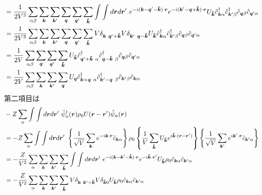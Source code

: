 \documentclass[dvipdfmx, 11pt, a4paper]{jsarticle}
\theoremstyle{definition}
\numberwithin{equation}{section}
\begin{document}
\begin{derivationBox}
\begin{align}
            &= \frac{1}{2V^3}\sum_{\alpha \beta} \sum_{\bm{k}} \sum_{\bm{k}'} \sum_{\bm{q}} \sum_{\bm{q}'}\sum_{\bm{\tilde{k}}}\int \int d\bm{r} d\bm{r}'\  e^{-i(\bm{k}-\bm{q}'-\bm{\tilde{k}})\cdot \bm{r}}  e^{-i(\bm{k}'-\bm{q} + \bm{\tilde{k}})\cdot \bm{r}}  U_{\bm{\tilde{k}}}  \hat{c}^\dagger_{\bm{k}\alpha}\hat{c}^\dagger_{\bm{k}'\beta} \hat{c}_{\bm{q}\beta} \hat{c}_{\bm{q}'\alpha}\notag \\
            &= \frac{1}{2V^3}\sum_{\alpha \beta} \sum_{\bm{k}} \sum_{\bm{k}'} \sum_{\bm{q}} \sum_{\bm{q}'}\sum_{\bm{\tilde{k}}}  V \delta_{\bm{k}\ \bm{q}'+\bm{\tilde{k}}}  V\delta_{\bm{k}'\ \bm{q} - \bm{\tilde{k}}}  U_{\bm{\tilde{k}}}  \hat{c}^\dagger_{\bm{k}\alpha}\hat{c}^\dagger_{\bm{k}'\beta} \hat{c}_{\bm{q}\beta} \hat{c}_{\bm{q}'\alpha}\notag \\
            &= \frac{1}{2V}\sum_{\alpha \beta}  \sum_{\bm{q}} \sum_{\bm{q}'}\sum_{\bm{\tilde{k}}}   U_{\bm{\tilde{k}}}  \hat{c}^\dagger_{\bm{q}'+\bm{\tilde{k}}\ \alpha}\hat{c}^\dagger_{\bm{q} - \bm{\tilde{k}}\ \beta} \hat{c}_{\bm{q}\beta} \hat{c}_{\bm{q}'\alpha} \notag \\
            &= \frac{1}{2V}\sum_{\alpha \beta}  \sum_{\bm{k}} \sum_{\bm{k}'}\sum_{\bm{q}}   U_{\bm{q}}  \hat{c}^\dagger_{\bm{k}+\bm{q}\ \alpha}\hat{c}^\dagger_{\bm{k}' - \bm{q}\ \beta} \hat{c}_{\bm{k}'\beta} \hat{c}_{\bm{k}\alpha}
        \end{align} 
        第二項目は
        \begin{align}
            &-Z\sum_\alpha \int \int d\bm{r} d\bm{r}'\ \hat{\psi}^\dagger_\alpha(\bm{r}) \rho_0 U(\bm{r}-\bm{r}') \hat{\psi}_{\alpha}(\bm{r}) \notag \\
            &= -Z\sum_\alpha \int \int d\bm{r} d\bm{r}'\ \left\{ \frac{1}{\sqrt{V}}\sum_{\bm{k}}e^{-i\bm{k}\cdot \bm{r}}\hat{c}_{\bm{k}\alpha} \right\} \rho_0 \left\{ \frac{1}{V}\sum_{\bm{\tilde{k}}}U_{\bm{\tilde{k}}}e^{i\bm{\tilde{k}}\cdot (\bm{r}-\bm{r}')} \right\}\left\{ \frac{1}{\sqrt{V}}\sum_{\bm{k}'}e^{i\bm{k}'\cdot \bm{r}}\hat{c}_{\bm{k}'\alpha} \right\} \notag \\
            &= -\frac{Z}{V^2}\sum_\alpha \sum_{\bm{k}} \sum_{\bm{k}'} \sum_{\bm{\tilde{k}}}\int \int d\bm{r} d\bm{r}'\ e^{-i(\bm{k} - \bm{k}'-\bm{\tilde{k}})\cdot \bm{r}}  e^{-i\bm{\tilde{k}}\cdot \bm{r}'} U_{\bm{\tilde{k}}} \rho_0\hat{c}_{\bm{k}\alpha} \hat{c}_{\bm{k}'\alpha}  \notag \\
            &= -\frac{Z}{V^2}\sum_\alpha \sum_{\bm{k}} \sum_{\bm{k}'} \sum_{\bm{\tilde{k}}}V\delta_{\bm{k}\ \bm{k}'+\bm{\tilde{k}}}  V\delta_{\bm{\tilde{k}}0} U_{\bm{\tilde{k}}} \rho_0\hat{c}_{\bm{k}\alpha} \hat{c}_{\bm{k}'\alpha}  \notag \\

\end{align}
\end{derivationBox}
\end{document}
